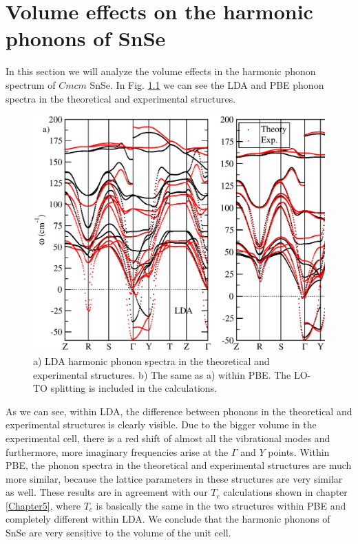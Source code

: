 
\chapter{Volume effects on the harmonic phonons of SnSe} %

\label{volume-effects} %

In this section we will analyze the volume effects in the harmonic phonon spectrum of $Cmcm$ SnSe. In 
Fig. \ref{harmonic-volume} we can see the LDA and
PBE phonon spectra in the theoretical and experimental structures.
\begin{figure}[th]
\begin{center}
\includegraphics[width=0.8\linewidth]{Figures/phonon-exp-dft.eps}
\caption{a) LDA harmonic phonon spectra in the theoretical and experimental structures. b) The same as a) within PBE. 
The LO-TO splitting is included in the calculations.}
\label{harmonic-volume}
\end{center}
\end{figure}
As we can see, within LDA, the difference between phonons in the theoretical and experimental structures is clearly 
visible. Due to the bigger volume in the experimental cell, there is a red shift of almost all the vibrational modes 
and furthermore, more imaginary frequencies arise at the $\Gamma$ and $Y$ points. Within PBE, the phonon spectra in 
the theoretical and experimental structures are much more similar, because the lattice parameters in these structures 
are very similar as well. These results are in agreement with our $T_{c}$ calculations shown in 
chapter \ref{Chapter5}, where $T_{c}$ is basically the same in the two structures within PBE and completely different 
within LDA. We conclude that the harmonic phonons of SnSe are very sensitive to the volume of the unit cell. \\

